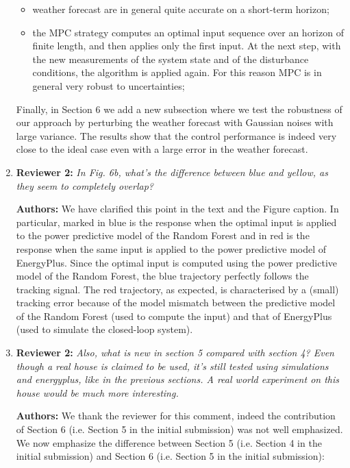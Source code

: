 \documentclass{article}
\begin{document}
\begin{enumerate}
	\begin{itemize}

	\item weather forecast are in general quite accurate on a short-term horizon;

	\item the MPC strategy computes an optimal input sequence over an horizon of finite length, and then applies only the first input. At the next step, with the new measurements of the system state and of the disturbance conditions, the algorithm is applied again. For this reason MPC is in general very robust to uncertainties;

	\end{itemize}
	Finally, in Section 6 we add a new subsection where we test the robustness of our approach by perturbing the weather forecast with Gaussian noises with large variance. The results show that the control performance is indeed very close to the ideal case even with a large error in the weather forecast.



\item \textbf{Reviewer 2:} \textit{In Fig. 6b, what's the difference between blue and yellow, as they seem to completely overlap?}



\textbf{Authors:} We have clarified this point in the text and the Figure caption. In particular, marked in blue is the response when the optimal input is applied to the power predictive model of the Random Forest and in red is the response when the same input is applied to the power predictive model of EnergyPlus. Since the optimal input is computed using the power predictive model of the Random Forest, the blue trajectory perfectly follows the tracking signal. The red trajectory, as expected, is characterised by a (small) tracking error because of the model mismatch between the predictive model of the Random Forest (used to compute the input) and that of EnergyPlus (used to simulate the closed-loop system).



\item \textbf{Reviewer 2:} \textit{Also, what is new in section 5 compared with section 4? Even though a real house is claimed to be used, it's still tested using simulations and energyplus, like in the previous sections. A real world experiment on this house would be much more interesting.}



\textbf{Authors:} We thank the reviewer for this comment, indeed the contribution of Section 6 (i.e. Section 5 in the initial submission) was not well emphasized. We now emphasize the difference between Section 5 (i.e. Section 4 in the initial submission) and Section 6 (i.e. Section 5 in the initial submission):
\begin{itemize}


\end{itemize}
\end{enumerate}
\end{document}
